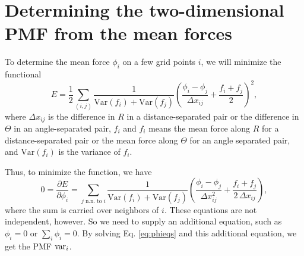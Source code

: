 \documentclass{article}
\begin{document}
\section{Determining the two-dimensional PMF from the mean forces}


To determine the mean force $\phi_i$ on a few grid points $i$,
we will minimize the functional
$$
E
=
\frac 1 2
\sum_{(i, j)}
\frac{ 1
}
{
  \mathrm{Var} (f_i) + \mathrm{Var} (f_j)
}
  \left(
  \frac {\phi_i - \phi_j} { \Delta x_{ij} }
  +
  \frac{ f_i + f_j } { 2 }
  \right)^2
,
$$
where
$\Delta x_{ij}$ is the difference in $R$
in a distance-separated pair
or the difference in $\Theta$
in an angle-separated pair,
$f_i$ and $f_i$ means the mean force
along $R$ for a distance-separated pair
or the mean force along $\Theta$
for an angle separated pair,
and
$\mathrm{Var}(f_i)$
is the variance of $f_i$.

Thus, to minimize the function, we have
\begin{equation}
0
=
\frac{ \partial E } { \partial \phi_i }
=
\sum_{j \mathrm{\; n.n. \; to\; } i }
\frac{
  1
}
{
  \mathrm{Var} (f_i) + \mathrm{Var} (f_j)
}
\left(
  \frac {\phi_i - \phi_j} { \Delta x_{ij}^2 }
  +
  \frac{ f_i + f_j } { 2 \, \Delta x_{ij} }
\right)
,
\label{eq:phieqs}
\end{equation}
where the sum is carried over neighbors of $i$.
These equations are not independent, however.
%
So we need to supply an additional equation,
such as $\phi_i = 0$ or $\sum_i \phi_i = 0$.
%
By solving Eq. \eqref{eq:phieqs} and this additional equation,
we get the PMF $\mathrm{var}_i$.

%
%
\end{document}
